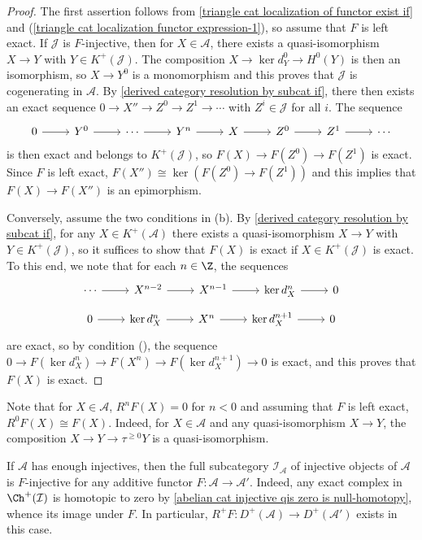 \begin{proof}
The first assertion follows from \cref{triangle cat localization of functor exist if} and (\ref{triangle cat localization functor expression-1}), so assume that $F$ is left exact. If $\mathcal{J}$ is $F$-injective, then for $X\in\mathcal{A}$, there exists a quasi-isomorphism $X\to Y$ with $Y\in K^+(\mathcal{J})$. The composition $X\to\ker d_Y^0\to H^0(Y)$ is then an isomorphism, so $X\to Y^0$ is a monomorphism and this proves that $\mathcal{J}$ is cogenerating in $\mathcal{A}$. By \cref{derived category resolution by subcat if}, there then exists an exact sequence $0\to X''\to Z^0\to Z^1\to\cdots$ with $Z^i\in\mathcal{J}$ for all $i$. The sequence
\[\begin{tikzcd}
0\ar[r]&Y^0\ar[r]&\cdots\ar[r]&Y^n\ar[r]&X\ar[r]&Z^0\ar[r]&Z^1\ar[r]&\cdots
\end{tikzcd}\]
is then exact and belongs to $K^+(\mathcal{J})$, so $F(X)\to F(Z^0)\to F(Z^1)$ is exact. Since $F$ is left exact, $F(X'')\cong \ker(F(Z^0)\to F(Z^1))$ and this implies that $F(X)\to F(X'')$ is an epimorphism.\par
Conversely, assume the two conditions in (b). By \cref{derived category resolution by subcat if}, for any $X\in K^+(\mathcal{A})$ there exists a quasi-isomorphism $X\to Y$ with $Y\in K^+(\mathcal{J})$, so it suffices to show that $F(X)$ is exact if $X\in K^+(\mathcal{J})$ is exact. To this end, we note that for each $n\in\Z$, the sequences
\[\begin{tikzcd}
\cdots\ar[r]&X^{n-2}\ar[r]&X^{n-1}\ar[r]&\ker d^n_X\ar[r]&0
\end{tikzcd}\]
\vspace*{-5mm}
\[\begin{tikzcd}
0\ar[r]&\ker d^n_X\ar[r]&X^n\ar[r]&\ker d^{n+1}_X\ar[r]&0
\end{tikzcd}\]
are exact, so by condition (), the sequence $0\to F(\ker d^n_X)\to F(X^n)\to F(\ker d^{n+1}_X)\to 0$ is exact, and this proves that $F(X)$ is exact.
\end{proof}

\begin{remark}
Note that for $X\in\mathcal{A}$, $R^nF(X)=0$ for $n<0$ and assuming that $F$ is left exact, $R^0F(X)\cong F(X)$. Indeed, for $X\in\mathcal{A}$ and any quasi-isomorphism $X\to Y$, the composition $X\to Y\to \tau^{\geq 0}Y$ is a quasi-isomorphism.
\end{remark}
\begin{example}
If $\mathcal{A}$ has enough injectives, then the full subcategory $\mathcal{I}_\mathcal{A}$ of injective objects of $\mathcal{A}$ is $F$-injective for any additive functor $F:\mathcal{A}\to\mathcal{A}'$. Indeed, any exact complex in $\Ch^+(\mathcal{I})$ is homotopic to zero by \cref{abelian cat injective qis zero is null-homotopy}, whence its image under $F$. In particular, $R^+F:D^+(\mathcal{A})\to D^+(\mathcal{A}')$ exists in this case.
\end{example}

